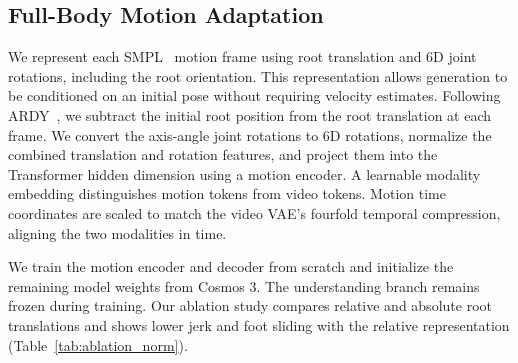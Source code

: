 \subsection{Full-Body Motion Adaptation}
We represent each SMPL~\citep{SMPL:2015} motion frame using root translation and 6D joint rotations, including the root orientation. This representation allows generation to be conditioned on an initial pose without requiring velocity estimates. Following ARDY~\citep{zhao2026ardy}, we subtract the initial root position from the root translation at each frame. We convert the axis-angle joint rotations to 6D rotations, normalize the combined translation and rotation features, and project them into the Transformer hidden dimension using a motion encoder. A learnable modality embedding distinguishes motion tokens from video tokens. Motion time coordinates are scaled to match the video VAE's fourfold temporal compression, aligning the two modalities in time.

We train the motion encoder and decoder from scratch and initialize the remaining model weights from Cosmos 3. The understanding branch remains frozen during training. Our ablation study compares relative and absolute root translations and shows lower jerk and foot sliding with the relative representation (Table~\ref{tab:ablation_norm}).

